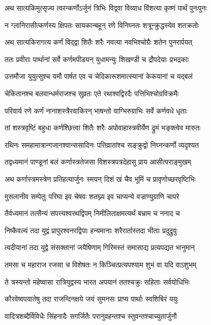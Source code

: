 \twolineshloka
{अथ सात्यकिमुत्सृज्य त्वरन्कर्णोऽर्जुनं त्रिभिः}
{विद्व्वा विव्याध विंशत्या कृष्णं पार्थं पुनःपुनः}


\twolineshloka
{न ग्लानिरासीत्कर्णस्य क्षिपतः सायकान्बहून्}
{रणे विनिघ्नतः शत्रून्क्रुद्धस्येव शतक्रतोः}


\twolineshloka
{अथ सात्यकिरागत्य कर्णं विद्द्वा शितैः शरैः}
{नवत्या नवभिश्चोग्रैः शतेन पुनरार्पयत्}


\twolineshloka
{ततः प्रवीराः पार्थानां सर्वे कर्णमपीडयन्}
{युधामन्युः शिखण्डी च द्रौपदेयाः प्रभद्रकाः}


\twolineshloka
{उत्तमौजा युयुत्सुश्च यमौ पार्षत एव च}
{चेदिकारूशमात्स्यानां केकयानां च यद्बलं}


\twolineshloka
{चेकितानश्च बलवान्धर्मराजश्च सुव्रतः}
{एते रथाश्वद्विरदैः पत्तिभिश्चोग्रविक्रमैः}


\twolineshloka
{परिवार्य रणे कर्णं नानाशस्त्रैरवाकिरन्}
{भाषन्तो वाग्भिरुग्राभिः सर्वे कर्णवधे धृताः}


\twolineshloka
{तां शस्त्रवृष्टिं बहुधा कर्णश्छित्त्वा शितैः शरैः}
{अपोवाहास्त्रवीर्येण द्रुमं भङ्क्त्वेव मारुतः}


\twolineshloka
{रथिनः समहामात्रान्गजानश्वान्ससादिनः}
{पत्तिव्रातांश्च सङ्क्रुद्वो निघ्नन्कर्णो व्यदृश्यत}


\twolineshloka
{तद्वध्यमानं पाण्डूनां बलं कर्णास्त्रतेजसा}
{विशस्त्रपत्रदेहासु प्राय आसीत्पराङ्मुखम्}


\twolineshloka
{अथ कर्णास्त्रमस्त्रेण प्रतिहत्यार्जुनः स्मयन्}
{दिशं खं चैव भूमिं च प्रावृणोच्छरवृष्टिभिः}


\twolineshloka
{मुसलानीव सम्पेतुः परिघा इव चेषवः}
{शतघ्न्य इव चाप्यन्ये वज्राण्युग्राणि चापरे}


\twolineshloka
{तैर्वध्यमानं तत्सैन्यं सपत्त्यश्वरथद्विपम्}
{निमीलिताक्षमत्यर्थं बभ्राम च ननाद च}


\twolineshloka
{निष्कैवल्यं तदा युद्वं प्रापुरश्वनरद्विपाः}
{हन्यमानाः शरैरार्तास्तदा भीताः प्रदुद्रुवुः}


\twolineshloka
{त्वदीयानां तदा युद्वे संसक्तानां जयैषिणाम्}
{गिरिमस्तं समासाद्य प्रत्यपद्यत भानुमान्}


\twolineshloka
{तमसा च महाराज रजसा च विशेषतः}
{न किञ्चित्प्रत्यपश्याम शुभं वा यदि वाऽशुभम्}


\twolineshloka
{ते त्रस्यन्तो महेष्वासा रात्रियुद्वस्य भारत}
{अपयानं ततश्चक्रुः सहिताः सर्वयोधिभिः}


\twolineshloka
{कौरवेष्वपयातेषु तदा राजन्दिनक्षये}
{जयं सुमनसः प्राप्य पार्थाः स्वशिबिरं ययुः}


\twolineshloka
{वादित्रशब्दैर्विविधैः सिंहनादैः सगर्जितैः}
{परानुवहन्तश्च स्तुवन्तश्चाच्युतार्जुनौ}


